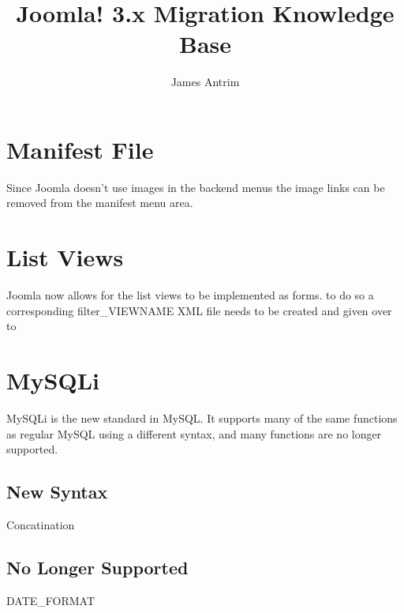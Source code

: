 \documentclass[]{article}
\title{Joomla! 3.x Migration Knowledge Base}
\author{James Antrim}
\begin{document}
\maketitle


\section{Manifest File}
Since Joomla doesn't use images in the backend menus the image links can be removed from the manifest menu area.

\section{List Views}
Joomla now allows for the list views to be implemented as forms. to do so a corresponding filter\_VIEWNAME XML file needs to be created and given over to 

\section{MySQLi}
MySQLi is the new standard in MySQL. It supports many of the same functions as regular MySQL using a different syntax, and many functions are no longer supported.

\subsection{New Syntax}

Concatination  

\subsection{No Longer Supported}

DATE\_FORMAT
\end{document}
